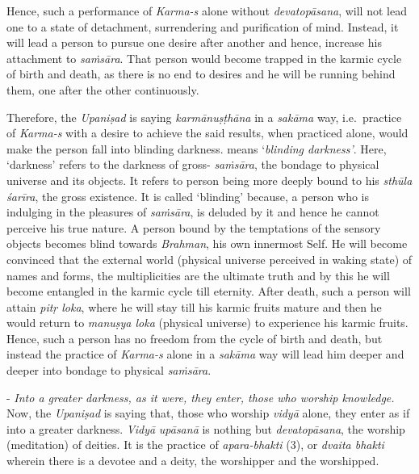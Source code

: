 Hence, such a performance of \emph{Karma-s} alone without \emph{devatopā\-sana}, will not lead one to a state of detachment, surrendering and purification of mind. Instead, it will lead a person to pursue one desire after another and hence, increase his attachment to \emph{saṁsāra}. That person would become trapped in the karmic cycle of birth and death, as there is no end to desires and he will be running behind them, one after the other continuously.
\vskip 2pt

Therefore, the \emph{Upaniṣad} is saying \emph{karmānuṣṭhāna} in a \emph{sakāma} way, i.e.\ practice of \emph{Karma-s} with a desire to achieve the said results, when practiced alone, would make the person fall into blinding darkness.  means `\emph{blinding darkness'}. Here, `darkness' refers to the darkness of gross- \emph{saṁsāra}, the bondage to physical universe and its objects. It refers to person being more deeply bound to his \emph{sthūla śarīra}, the gross existence. It is called `blinding' because, a person who is indulging in the pleasures of \emph{saṁsāra}, is deluded by it and hence he cannot perceive his true nature. A person bound by the temptations of the sensory objects becomes blind towards \emph{Brahman}, his own innermost Self. He will become convinced that the external world (physical universe perceived in waking state) of names and forms, the multiplicities are the ultimate truth and by this he will become entangled in the karmic cycle till eternity. After death, such a person will attain \emph{pitṛ loka}, where he will stay till his karmic fruits mature and then he would return to \emph{manuṣya loka} (physical universe) to experience his karmic fruits. Hence, such a person has no freedom from the cycle of birth and death, but instead the practice of \emph{Karma-s} alone in a \emph{sakāma} way will lead him deeper and deeper into bondage to physical \emph{saṁsāra}.
\vskip 2pt

- \emph{Into a greater darkness, as it were, they enter, those who worship knowledge.} Now, the \emph{Upaniṣad} is saying that, those who worship \emph{vidyā} alone, they enter as if into a greater darkness. \emph{Vidyā} \emph{upāsanā} is nothing but \emph{devatopāsana}, the worship (meditation) of deities. It is the practice of \emph{apara-bhakti} (3), or \emph{dvaita bhakti} wherein there is a devotee and a deity, the worshipper and the worshipped.

